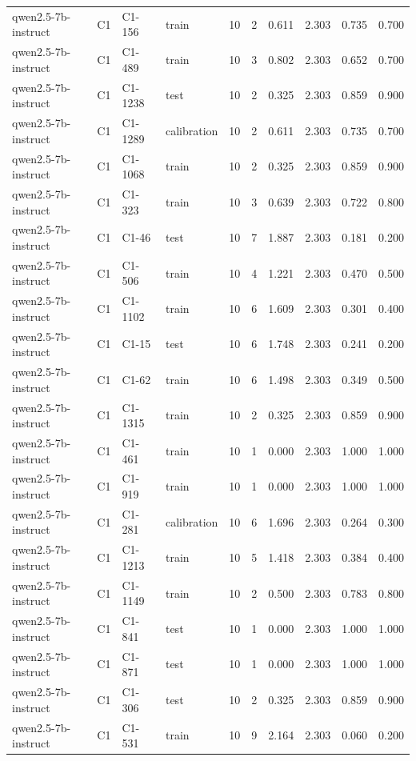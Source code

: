 \begin{table}
\begin{tabular}{llllrrrrrr}
qwen2.5-7b-instruct & C1 & C1-156 & train & 10 & 2 & 0.611 & 2.303 & 0.735 & 0.700 \\
qwen2.5-7b-instruct & C1 & C1-489 & train & 10 & 3 & 0.802 & 2.303 & 0.652 & 0.700 \\
qwen2.5-7b-instruct & C1 & C1-1238 & test & 10 & 2 & 0.325 & 2.303 & 0.859 & 0.900 \\
qwen2.5-7b-instruct & C1 & C1-1289 & calibration & 10 & 2 & 0.611 & 2.303 & 0.735 & 0.700 \\
qwen2.5-7b-instruct & C1 & C1-1068 & train & 10 & 2 & 0.325 & 2.303 & 0.859 & 0.900 \\
qwen2.5-7b-instruct & C1 & C1-323 & train & 10 & 3 & 0.639 & 2.303 & 0.722 & 0.800 \\
qwen2.5-7b-instruct & C1 & C1-46 & test & 10 & 7 & 1.887 & 2.303 & 0.181 & 0.200 \\
qwen2.5-7b-instruct & C1 & C1-506 & train & 10 & 4 & 1.221 & 2.303 & 0.470 & 0.500 \\
qwen2.5-7b-instruct & C1 & C1-1102 & train & 10 & 6 & 1.609 & 2.303 & 0.301 & 0.400 \\
qwen2.5-7b-instruct & C1 & C1-15 & test & 10 & 6 & 1.748 & 2.303 & 0.241 & 0.200 \\
qwen2.5-7b-instruct & C1 & C1-62 & train & 10 & 6 & 1.498 & 2.303 & 0.349 & 0.500 \\
qwen2.5-7b-instruct & C1 & C1-1315 & train & 10 & 2 & 0.325 & 2.303 & 0.859 & 0.900 \\
qwen2.5-7b-instruct & C1 & C1-461 & train & 10 & 1 & 0.000 & 2.303 & 1.000 & 1.000 \\
qwen2.5-7b-instruct & C1 & C1-919 & train & 10 & 1 & 0.000 & 2.303 & 1.000 & 1.000 \\
qwen2.5-7b-instruct & C1 & C1-281 & calibration & 10 & 6 & 1.696 & 2.303 & 0.264 & 0.300 \\
qwen2.5-7b-instruct & C1 & C1-1213 & train & 10 & 5 & 1.418 & 2.303 & 0.384 & 0.400 \\
qwen2.5-7b-instruct & C1 & C1-1149 & train & 10 & 2 & 0.500 & 2.303 & 0.783 & 0.800 \\
qwen2.5-7b-instruct & C1 & C1-841 & test & 10 & 1 & 0.000 & 2.303 & 1.000 & 1.000 \\
qwen2.5-7b-instruct & C1 & C1-871 & test & 10 & 1 & 0.000 & 2.303 & 1.000 & 1.000 \\
qwen2.5-7b-instruct & C1 & C1-306 & test & 10 & 2 & 0.325 & 2.303 & 0.859 & 0.900 \\
qwen2.5-7b-instruct & C1 & C1-531 & train & 10 & 9 & 2.164 & 2.303 & 0.060 & 0.200 \\

\end{tabular}
\end{table}
